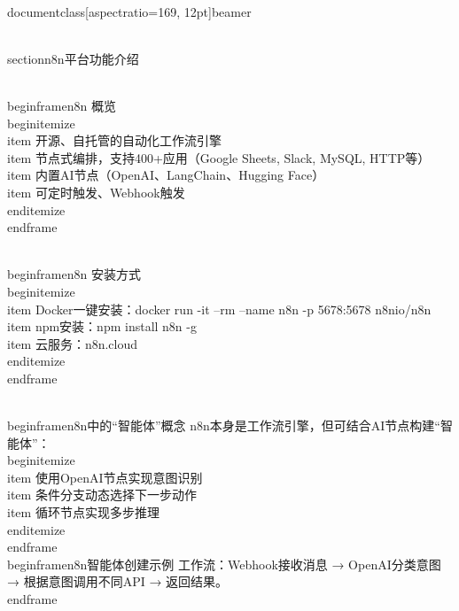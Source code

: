 \\documentclass[aspectratio=169, 12pt]{beamer}
\begin{document}

\\section{n8n平台功能介绍}

\\begin{frame}{n8n 概览}
\\begin{itemize}
\\item 开源、自托管的自动化工作流引擎
\\item 节点式编排，支持400+应用（Google Sheets, Slack, MySQL, HTTP等）
\\item 内置AI节点（OpenAI、LangChain、Hugging Face）
\\item 可定时触发、Webhook触发
\\end{itemize}
\\end{frame}

\\begin{frame}{n8n 安装方式}
\\begin{itemize}
\\item Docker一键安装：docker run -it --rm --name n8n -p 5678:5678 n8nio/n8n
\\item npm安装：npm install n8n -g
\\item 云服务：n8n.cloud
\\end{itemize}
\\end{frame}

\\begin{frame}{n8n中的“智能体”概念}
n8n本身是工作流引擎，但可结合AI节点构建“智能体”：
\\begin{itemize}
\\item 使用OpenAI节点实现意图识别
\\item 条件分支动态选择下一步动作
\\item 循环节点实现多步推理
\\end{itemize}
\\end{frame}
\\begin{frame}{n8n智能体创建示例}
工作流：Webhook接收消息 → OpenAI分类意图 → 根据意图调用不同API → 返回结果。
\\end{frame}
\end{document}
